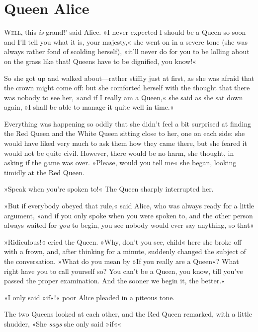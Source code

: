 \chapter{Queen Alice}

\lettrine[lines=4,ante=`]{W}{ell,} this \textit{is} grand!' said Alice. »I never expected I should be a Queen so soon—and I'll tell you what it is, your majesty,« she went on in a severe tone (she was always rather fond of scolding herself), »it'll never do for you to be lolling about on the grass like that! Queens have to be dignified, you know!«

So she got up and walked about—rather stiffly just at first, as she was afraid that the crown might come off: but she comforted herself with the thought that there was nobody to see her, »and if I really am a Queen,« she said as she sat down again, »I shall be able to manage it quite well in time.«

Everything was happening so oddly that she didn't feel a bit surprised at finding the Red Queen and the White Queen sitting close to her, one on each side: she would have liked very much to ask them how they came there, but she feared it would not be quite civil. However, there would be no harm, she thought, in asking if the game was over. »Please, would you tell me\longdash« she began, looking timidly at the Red Queen.

\label{black8}

»Speak when you're spoken to!« The Queen sharply interrupted her.

»But if everybody obeyed that rule,« said Alice, who was always ready for a little argument, »and if you only spoke when you were spoken to, and the other person always waited for \textit{you} to begin, you see nobody would ever say anything, so that\longdash«

»Ridiculous!« cried the Queen. »Why, don't you see, child\longdash« here she broke off with a frown, and, after thinking for a minute, suddenly changed the subject of the conversation. »What do you mean by »If you really are a Queen«? What right have you to call yourself so? You can't be a Queen, you know, till you've passed the proper examination. And the sooner we begin it, the better.«

»I only said »if«!« poor Alice pleaded in a piteous tone.

The two Queens looked at each other, and the Red Queen remarked, with a little shudder, »She \textit{says} she only said »if«\longdash«


